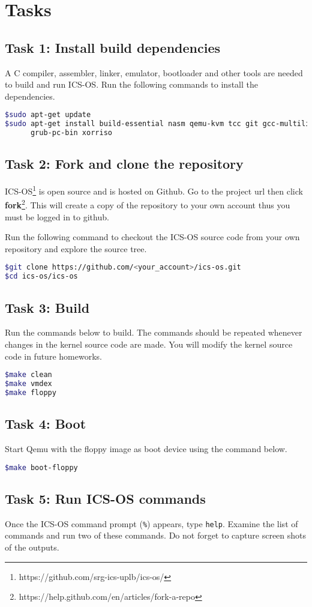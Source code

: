 \documentclass[a4paper, 11pt,oneside]{article}
\begin{document}
\section{Tasks}

\subsection*{Task 1: Install build dependencies}
A C compiler, assembler, linker, emulator, bootloader and other tools are needed to 
build and run ICS-OS. Run the following commands to install the dependencies.

\begin{lstlisting}[language=bash,frame=single]
$sudo apt-get update
$sudo apt-get install build-essential nasm qemu-kvm tcc git gcc-multilib \
      grub-pc-bin xorriso
\end{lstlisting}

\subsection*{Task 2: Fork and clone the repository}
ICS-OS\footnote{https://github.com/srg-ics-uplb/ics-os/} is open source and is hosted on Github. 
Go to the project url then click \textbf{fork}\footnote{https://help.github.com/en/articles/fork-a-repo}. This will create a copy of the repository to your own account thus 
you must be logged in to github.

Run the following command to 
checkout the ICS-OS source code from your own repository and explore the source tree.
\begin{lstlisting}[language=bash,frame=single] 
$git clone https://github.com/<your_account>/ics-os.git
$cd ics-os/ics-os
\end{lstlisting}

\subsection*{Task 3: Build}
Run the commands below to build. The commands should be repeated 
whenever changes in the kernel source code are made. You will modify the kernel source 
code in future homeworks. 
\begin{lstlisting}[language=bash,frame=single] 
$make clean
$make vmdex
$make floppy 
\end{lstlisting}

\subsection*{Task 4: Boot}
Start Qemu with the floppy image as boot device using the command below. 
\begin{lstlisting}[language=bash,frame=single] 
$make boot-floppy 
\end{lstlisting}

\subsection*{Task 5: Run ICS-OS commands}
Once the ICS-OS command prompt (\texttt{\%}) appears, type \texttt{help}. 
Examine the list of commands and run two of these commands. Do not forget 
to capture screen shots of the outputs.

\end{document}
